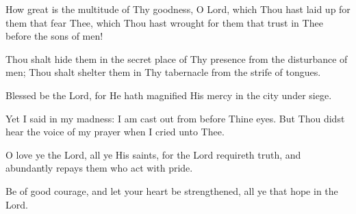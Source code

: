 How great is the multitude of Thy goodness, O Lord, which Thou hast laid up for them that fear Thee, which Thou hast wrought for them that trust in Thee before the sons of men!

Thou shalt hide them in the secret place of Thy presence from the disturbance of men; Thou shalt shelter them in Thy tabernacle from the strife of tongues.

Blessed be the Lord, for He hath magnified His mercy in the city under siege.

Yet I said in my madness: I am cast out from before Thine eyes. But Thou didst hear the voice of my prayer when I cried unto Thee.

O love ye the Lord, all ye His saints, for the Lord requireth truth, and abundantly repays them who act with pride.

Be of good courage, and let your heart be strengthened, all ye that hope in the Lord.
